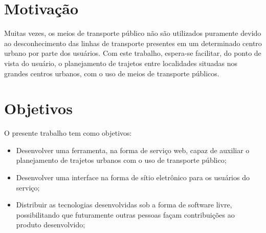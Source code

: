 \section{Motivação}

Muitas vezes, os meios de transporte público não são utilizados puramente devido ao desconhecimento das linhas de transporte presentes em um determinado centro urbano por parte dos usuários. Com este trabalho, espera-se facilitar, do ponto de vista do usuário, o planejamento de trajetos entre localidades situadas nos grandes centros urbanos, com o uso de meios de transporte públicos.

\section{Objetivos}

O presente trabalho tem como objetivos:

\begin{itemize}
	\item Desenvolver uma ferramenta, na forma de serviço web, capaz de auxiliar o planejamento de trajetos urbanos com o uso de transporte público;
	\item Desenvolver uma interface na forma de sítio eletrônico para os usuários do serviço;
	\item Distribuir as tecnologias desenvolvidas sob a forma de software livre, possibilitando que futuramente outras pessoas façam contribuições ao produto desenvolvido;
\end{itemize}


